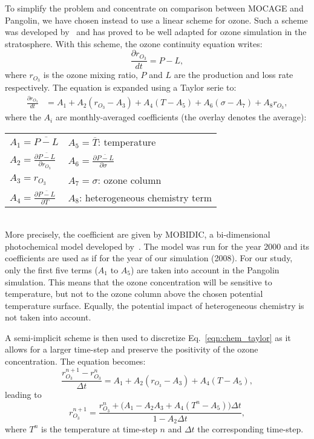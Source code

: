 To simplify the problem and concentrate on comparison between MOCAGE and
Pangolin, we have chosen instead to use a linear scheme for ozone. Such a
scheme was developed by~\cite{Cariolle2007} and has proved to be well
adapted for ozone simulation in the stratosphere. With this scheme, the ozone
continuity equation writes:
\begin{equation*}
  \frac{\partial r_{O_3}}{dt} = P-L,
\end{equation*}
where $r_{O_3}$ is the ozone mixing ratio, $P$ and $L$ are the production and
loss rate respectively. The equation is expanded using a Taylor serie to:
\begin{align}
  \frac{\partial r_{O_3}}{dt} &= A_1 +A_2(r_{O_3}-A_3)+A_4(T-A_5) 
  +A_6 (\sigma -A_7)+A_8 r_{O_3},
\label{eqn:chem_taylor}
\end{align}
where the $A_i$ are monthly-averaged coefficients (the overlay denotes the
average):\\
\begin{tabular}{ll}
$A_1=\overline{P-L}$ & $A_5=\overline{T}$: temperature \\
$A_2=\frac{\partial \overline{P-L}}{\partial r_{O_3}}$ & $A_6=\frac{\partial \overline{P-L}}{\partial \sigma}$\\
$A_3= r_{O_3}$ & $A_7=\sigma$: ozone column \\
$A_4=\frac{\partial \overline{P-L}}{\partial T}$ & $A_8$: heterogeneous chemistry term\\
\end{tabular}\\
More precisely, the coefficient are given by MOBIDIC, a bi-dimensional
photochemical model developed by~\cite{Cariolle1985}. The model was run for the
year 2000 and its coefficients are used as if for the year of our simulation
(2008). 
For our study, only the first five terms ($A_1$ to $A_5$) are taken into account
in the Pangolin simulation. This means that the ozone concentration will be
sensitive to temperature, but not to the ozone column above the chosen potential
temperature surface. Equally, the potential impact of heterogeneous chemistry is
not taken into account. 

A semi-implicit scheme is then used to discretize Eq.~\eqref{eqn:chem_taylor} as
it allows for a larger time-step and preserve the positivity of the ozone
concentration. The equation becomes:
\begin{equation*}
  \frac{r_{O_3}^{n+1} - r_{O_3}^n}{\Delta t} = A_1 +A_2(r_{O_3}-A_3)+A_4(T-A_5), 
\label{eqn:chem_taylor}
\end{equation*}
leading to
\begin{equation*}
  r_{O_3}^{n+1} = \frac{r_{O_3}^n + \big(A_1 -A_2 A_3 + A_4 (T^n-A_5)\big)\Delta t}
  {1-A_2\Delta t},
\end{equation*}
where $T^n$ is the temperature at time-step $n$ and $\Delta t$ the corresponding
time-step.

